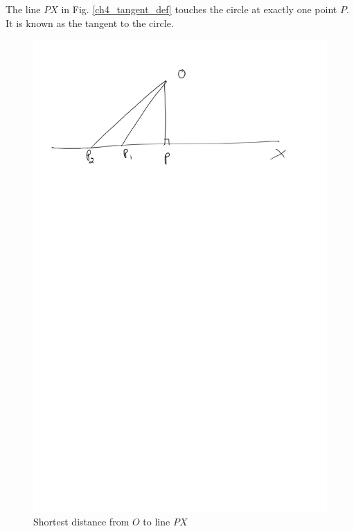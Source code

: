 %
\begin{definition}
	The line $PX$ in Fig. \ref{ch4_tangent_def} touches the circle at exactly one  point $P$. It is known as the tangent to the circle.
\end{definition}
%
%
\begin{figure}[!h]
	\begin{center}
		
		\includegraphics[width=\columnwidth]{./figs/ch4_short_dist}
		\vspace*{-10cm}
	\end{center}
	\caption{Shortest distance from $O$ to line $PX$}
	\label{ch4_short_dist}	
\end{figure}
